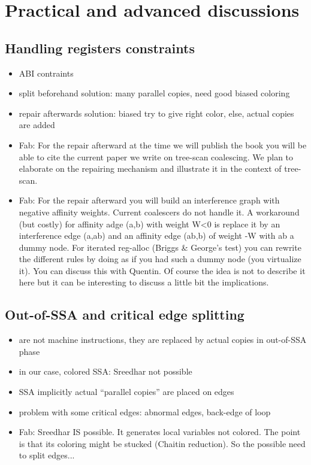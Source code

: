 {\section{Practical and advanced discussions}

\subsection{Handling registers constraints}
\begin{itemize}
  \item ABI contraints
  \item split beforehand solution: many parallel copies, need good biased 
    coloring
  \item repair afterwards solution: biased try to give right color, else, 
    actual copies are added
  \item Fab: For the repair afterward at the time we will publish the book you will be able to cite the current paper we write on tree-scan coalescing. We plan to elaborate on the repairing mechanism and illustrate it in the context of tree-scan.
  \item Fab: For the repair afterward you will build an interference graph with negative 
affinity weights. Current coalescers do not handle it. A workaround (but 
costly) for affinity adge (a,b) with weight W<0 is replace it by an 
interference edge (a,ab) and an affinity edge (ab,b) of weight -W with ab a 
dummy node. For iterated reg-alloc (Briggs \& George's test) you can rewrite the different rules by doing as if you had such a dummy node (you virtualize it). You can discuss this with Quentin. Of course the idea is not to describe it here but it can be interesting to discuss a little bit the implications.
\end{itemize}


\subsection{Out-of-SSA and critical edge splitting}
\begin{itemize}
  \item \phifuns are not machine instructions, they are replaced by actual 
    copies in out-of-SSA phase
  \item in our case, colored SSA: Sreedhar not possible
  \item SSA implicitly 
    actual ``parallel copies'' are placed on edges
  \item problem with some critical edges: abnormal edges, back-edge of loop
  \item Fab: Sreedhar IS possible. It generates local variables not colored.
The point is that its coloring might be stucked (Chaitin reduction). So the possible need to split edges...
\end{itemize}


}
